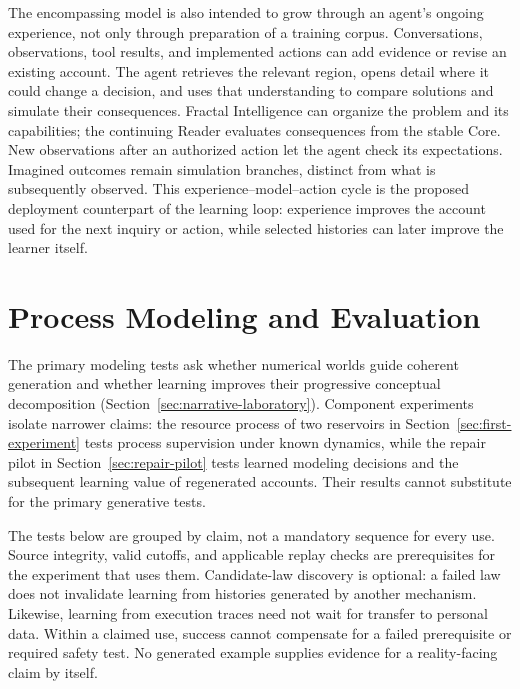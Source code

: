 \documentclass[10pt]{article}
\begin{document}
The encompassing model is also intended to grow through an agent's ongoing
experience, not only through preparation of a training corpus. Conversations,
observations, tool results, and implemented actions can add evidence or revise
an existing account. The agent retrieves the relevant region, opens detail
where it could change a decision, and uses that understanding to compare
solutions and simulate their consequences. Fractal Intelligence can organize
the problem and its capabilities; the continuing Reader evaluates consequences
from the stable Core. New observations after an authorized action let the agent
check its expectations. Imagined outcomes remain simulation branches,
distinct from what is subsequently observed. This experience--model--action
cycle is the proposed deployment counterpart of the learning loop:
experience improves the account used for the next inquiry or action, while
selected histories can later improve the learner itself.

\section{Process Modeling and Evaluation}
\label{sec:evaluation}

The primary modeling tests ask whether numerical worlds guide coherent
generation and whether learning improves their progressive conceptual
decomposition (Section~\ref{sec:narrative-laboratory}). Component experiments
isolate narrower claims: the resource process of two reservoirs in Section~\ref{sec:first-experiment} tests process supervision under
known dynamics, while the repair pilot in Section~\ref{sec:repair-pilot} tests
learned modeling decisions and the subsequent learning value of regenerated
accounts. Their results cannot substitute for the primary generative tests.

The tests below are grouped by claim, not a mandatory sequence for every use.
Source integrity, valid cutoffs, and applicable replay checks are prerequisites
for the experiment that uses them. Candidate-law discovery is optional: a
failed law does not invalidate learning from histories generated by another
mechanism. Likewise, learning from execution traces need not wait for transfer
to personal data. Within a claimed use, success cannot compensate for a failed
prerequisite or required safety test. No generated example supplies evidence
for a reality-facing claim by itself.
\end{document}
